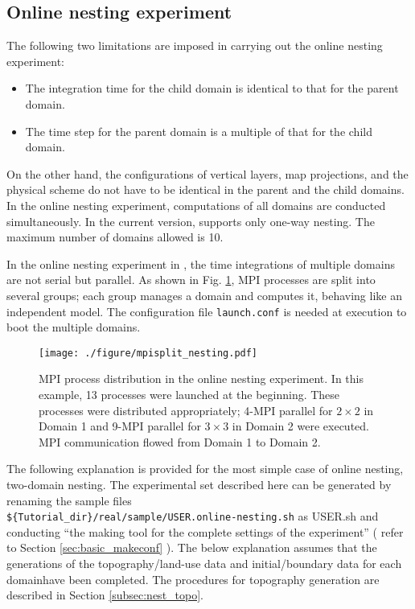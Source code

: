 \subsection{Online nesting experiment} \label{subsec:nest_online}

The following two limitations are imposed in carrying out the online nesting experiment:
\begin{itemize}
\item The integration time for the child domain is identical to that for the parent domain.
\item The time step for the parent domain is a multiple of that for the child domain.
\end{itemize}
On the other hand, the configurations of vertical layers, map projections, and the physical scheme do not have to be identical in the parent and the child domains. In the online nesting experiment, computations of all domains are conducted simultaneously. In the current version, \scalerm supports only one-way nesting. The maximum number of domains allowed is 10.

In the online nesting experiment in \scalerm, the time integrations of multiple domains are not serial but parallel. As shown in Fig. \ref{fig_mpisplit}, MPI processes are split into several groups; each group manages a domain and computes it, behaving like an independent model. The configuration file \verb|launch.conf| is needed at execution to boot the multiple domains.

\begin{figure}[tbh]
\begin{center}
  \texttt{[image: ./figure/mpisplit\_nesting.pdf]}\\
  \caption{ MPI process distribution in the online nesting experiment. In this example,   13 processes were launched at the beginning. These processes were distributed appropriately;     4-MPI parallel for $2 \times 2$ in Domain 1 and 9-MPI parallel for $3 \times 3$ in Domain 2 were executed.     MPI communication flowed from Domain 1 to Domain 2.
  }
  \label{fig_mpisplit}
\end{center}
\end{figure}

The following explanation is provided for the most simple case of online nesting, two-domain nesting.
The experimental set described here can be generated by renaming the sample files \\
\verb|${Tutorial_dir}/real/sample/USER.online-nesting.sh|
as USER.sh and conducting ``the making tool for the complete settings of the experiment'' ( refer to Section \ref{sec:basic_makeconf} ).
The below explanation assumes that the generations of the topography/land-use data and initial/boundary data for each domainhave been completed. The procedures for topography generation are described in Section \ref{subsec:nest_topo}.


